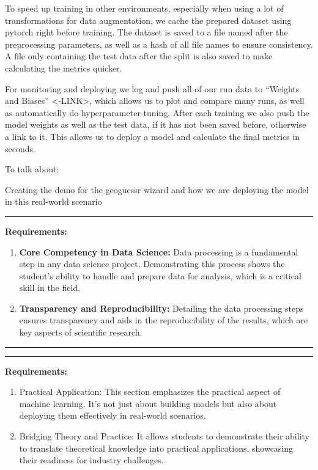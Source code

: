 To speed up training in other environments, especially when using a lot
of transformations for data augmentation, we cache the prepared dataset
using pytorch right before training. The dataset is saved to a file
named after the preprocessing parameters, as well as a hash of all file
names to ensure consistency. A file only containing the test data after
the split is also saved to make calculating the metrics quicker.

For monitoring and deploying we log and push all of our run data to
``Weights and Biases'' \textless-LINK\textgreater, which allows us to
plot and compare many runs, as well as automatically do
hyperparameter-tuning. After each training we also push the model
weights as well as the test data, if it has not been saved before,
otherwise a link to it. This allows us to deploy a model and calculate
the final metrics in seconds.

To talk about:

Creating the demo for the geoguessr wizard and how we are deploying the
model in this real-world scenario

\begin{center}\rule{0.5\linewidth}{0.5pt}\end{center}

\textbf{Requirements:}

\begin{enumerate}
\def\labelenumi{\arabic{enumi}.}
\tightlist
\item
  \textbf{Core Competency in Data Science:} Data processing is a
  fundamental step in any data science project. Demonstrating this
  process shows the student's ability to handle and prepare data for
  analysis, which is a critical skill in the field.
\item
  \textbf{Transparency and Reproducibility:} Detailing the data
  processing steps ensures transparency and aids in the reproducibility
  of the results, which are key aspects of scientific research.
\end{enumerate}

\begin{center}\rule{0.5\linewidth}{0.5pt}\end{center}

\begin{center}\rule{0.5\linewidth}{0.5pt}\end{center}

\textbf{Requirements:}

\begin{enumerate}
\def\labelenumi{\arabic{enumi}.}
\tightlist
\item
  Practical Application: This section emphasizes the practical aspect of
  machine learning. It's not just about building models but also about
  deploying them effectively in real-world scenarios.
\item
  Bridging Theory and Practice: It allows students to demonstrate their
  ability to translate theoretical knowledge into practical
  applications, showcasing their readiness for industry challenges.
\end{enumerate}

